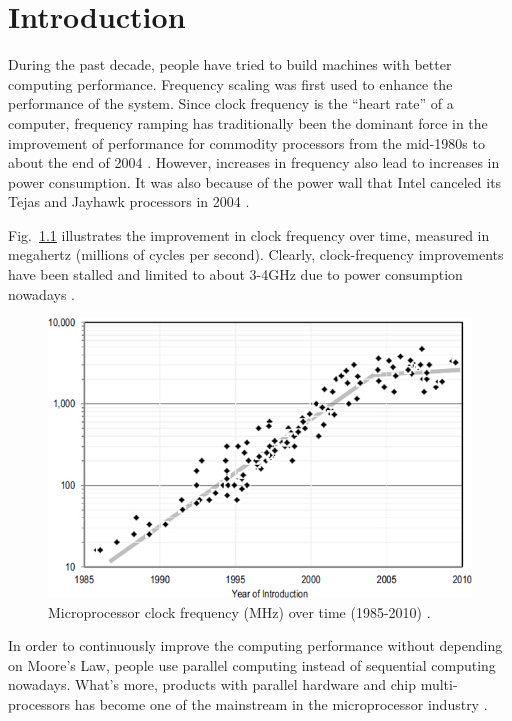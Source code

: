 

\let\clearpage\relax
\chapter{Introduction}

During the past decade, people have tried to build machines with better computing performance. Frequency scaling was first used to enhance the performance of the system. Since clock frequency is the ``heart rate'' of a computer, frequency ramping has traditionally been the dominant force in the improvement of performance for commodity processors from the mid-1980s to about the end of 2004 \cite{frequency_ramping}.  However, increases in frequency also lead to increases in power consumption.  It was also because of the power wall that Intel canceled its Tejas and Jayhawk processors in 2004 \cite{intel}.

Fig.~\ref{frequency} illustrates the improvement in clock frequency over time, measured in megahertz (millions of cycles per second). Clearly, clock-frequency improvements have been stalled and limited to about 3-4GHz due to power consumption nowadays \cite{nap}.
\begin{figure}[!htp]
    \centering
    \includegraphics[width=0.8\linewidth]{figure/frequency.jpg}
    \caption{Microprocessor clock frequency (MHz) over time (1985-2010) \cite{nap}.}
    \label{frequency}
\end{figure}

In order to continuously improve the computing performance without depending on Moore's Law, people use parallel computing instead of sequential computing nowadays. What's more, products with parallel hardware and chip multi-processors has become one of the mainstream in the microprocessor industry \cite{nap}.

